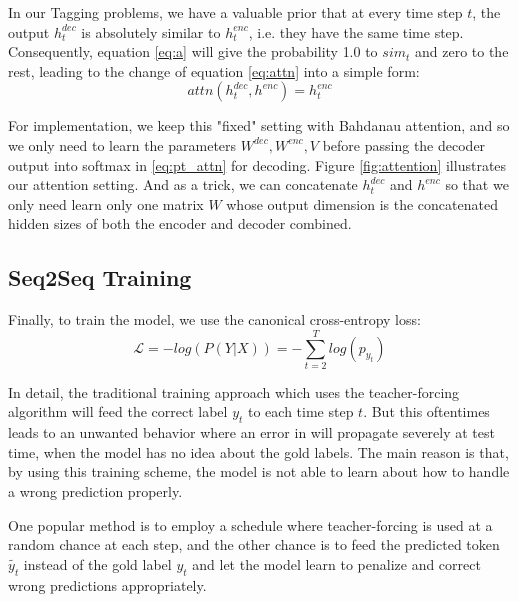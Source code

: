 \documentclass[11pt,a4paper]{article}
\begin{document}
In our Tagging problems, we have a valuable prior that at every time step $t$, the output $h^{dec}_t$ is absolutely similar to $h^{enc}_t$, i.e. they have the same time step. Consequently, equation \ref{eq:a} will give the probability 1.0 to $sim_t$ and zero to the rest, leading to the change of equation \ref{eq:attn} into a simple form:
  \begin{equation}
	  attn(h^{dec}_t, h^{enc}) = h^{enc}_t
  \end{equation}

For implementation, we keep this "fixed" setting with Bahdanau attention, and so we only need to learn the parameters $W^{dec},W^{enc}, V$ before passing the decoder output into softmax in \ref{eq:pt_attn} for decoding. Figure \ref{fig:attention} illustrates our attention setting. And as a trick, we can concatenate $h^{dec}_t$ and $h^{enc}$ so that we only need learn only one matrix $W$ whose output dimension is the concatenated hidden sizes of both the encoder and decoder combined. 

\subsection{Seq2Seq Training}
Finally, to train the model, we use the canonical cross-entropy loss: 
  \begin{equation}
      \mathcal{L} = -log(P(Y|X)) = - \sum^T_{t=2} log(p_{y_t})
  \end{equation}
  
In detail, the traditional training approach which uses the teacher-forcing algorithm will feed the correct label $y_t$ to each time step $t$. But this oftentimes leads to an unwanted behavior where an error in will propagate severely at test time, when the model has no idea about the gold labels. The main reason is that, by using this training scheme, the model is not able to learn about how to handle a wrong prediction properly. 

One popular method is to employ a schedule where teacher-forcing is used at a random chance at each step, and the other chance is to feed the predicted token $\tilde{y_t}$ instead of the gold label $y_t$ and let the model learn to penalize and correct wrong predictions appropriately. 

\end{document}
